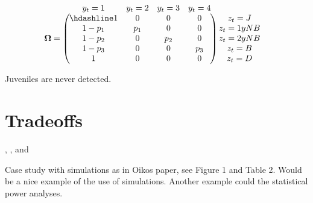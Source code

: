\documentclass[
  12pt,
]{krantz}
\begin{document}
\[\begin{matrix}
& \\
\mathbf{\Omega} =
  \left ( \vphantom{ \begin{matrix} 12 \\ 12 \\ 12 \\ 12 \\12 \end{matrix} } \right .
          \end{matrix}
          \hspace{-1.2em}
          \begin{matrix}
          y_t = 1 & y_t = 2 & y_t = 3 & y_t = 4\\ \hdashline
          1 & 0 & 0 & 0\\
          1 - p_1 & p_1 & 0 & 0\\
          1 - p_2 & 0 & p_2 & 0\\
          1 - p_3 & 0 & 0 & p_3\\
          1 & 0 & 0 & 0
          \end{matrix}
          \hspace{-0.2em}
          \begin{matrix}
          & \\
          \left . \vphantom{ \begin{matrix} 12 \\ 12 \\ 12 \\ 12 \\12 \end{matrix} } \right )
\begin{matrix}
z_t = J \\ z_t = 1yNB \\ z_t = 2yNB \\ z_t = B \\ z_t = D
\end{matrix}
\end{matrix}\]

Juveniles are never detected.

\section{Tradeoffs}\label{casestudytradeoff}

\citet{morano_life-history_2013}, \citet{shefferson_life_2003}, and \citet{cruz-flores_sex-specific_nodate}

Case study with simulations as in Oikos paper, see Figure 1 and Table 2. Would be a nice example of the use of simulations. Another example could the statistical power analyses.
\end{document}

